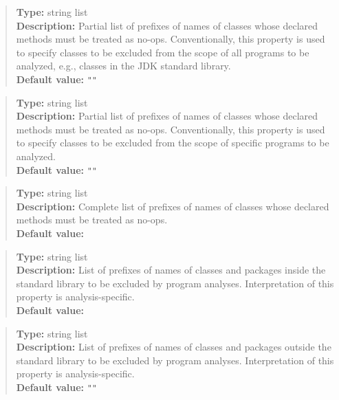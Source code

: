 \begin{quote}
{\bf Type:} string list \\
{\bf Description:} Partial list of prefixes of names of classes whose declared methods must be treated as no-ops.  Conventionally, this property is used to specify classes to be excluded from the scope of all programs to be analyzed, e.g., classes in the JDK standard library. \\
{\bf Default value:} {\tt ""}
\end{quote}

\begin{quote}
{\bf Type:} string list \\
{\bf Description:} Partial list of prefixes of names of classes whose declared methods must be treated as no-ops.  Conventionally, this property is used to specify classes to be excluded from the scope of specific programs to be analyzed. \\
{\bf Default value:} {\tt ""}
\end{quote}

\begin{quote}
{\bf Type:} string list \\
{\bf Description:} Complete list of prefixes of names of classes whose declared methods must be treated as no-ops. \\
{\bf Default value:} 
\end{quote}

\begin{quote}
{\bf Type:} string list \\
{\bf Description:} List of prefixes of names of classes and packages inside the standard library to be excluded by program analyses.  Interpretation of this property is analysis-specific. \\
{\bf Default value:}  
\end{quote}

\begin{quote}
{\bf Type:} string list \\
{\bf Description:} List of prefixes of names of classes and packages outside the standard library to be excluded by program analyses.  Interpretation of this property is analysis-specific. \\
{\bf Default value:} {\tt ""}
\end{quote}

